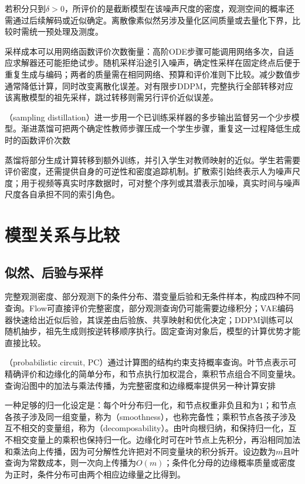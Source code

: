 若积分只到$\delta>0$，所评价的是截断模型在该噪声尺度的密度，观测空间的概率还需通过后续解码或近似确定。离散像素似然另涉及量化区间质量或去量化下界，比较时需统一预处理及测度。

采样成本可以用网络函数评价次数衡量：高阶ODE步骤可能调用网络多次，自适应求解器还可能拒绝试步。随机采样沿途引入噪声，确定性采样在固定终点后便于重复生成与编码；两者的质量需在相同网络、预算和评价准则下比较。减少数值步通常降低计算，同时改变离散化误差。对有限步DDPM，完整执行全部转移对应该离散模型的祖先采样，跳过转移则需另行评价近似误差。

（sampling distillation）进一步用一个已训练采样器的多步输出监督另一个少步模型。渐进蒸馏可把两个确定性教师步骤压成一个学生步骤，重复这一过程降低生成时的函数评价次数

蒸馏将部分生成计算转移到额外训练，并引入学生对教师映射的近似。学生若需要评价密度，还需提供自身的可逆性和密度追踪机制。扩散索引始终表示人为噪声尺度；用于视频等真实时序数据时，可对整个序列或其潜表示加噪，真实时间与噪声尺度各自承担不同的索引角色。

\section{模型关系与比较}
\label{sec:pgm-generative-comparison}

\subsection{似然、后验与采样}
\label{sec:pgm-generative-likelihood-posterior-sampling}

完整观测密度、部分观测下的条件分布、潜变量后验和无条件样本，构成四种不同查询。Flow可直接评价完整密度，部分观测查询仍可能需要边缘积分；VAE编码器快速给出近似后验，其误差由后验族、共享映射和优化决定；DDPM训练可以随机抽步，祖先生成则按逆转移顺序执行。固定查询对象后，模型的计算优势才能直接比较。

（probabilistic circuit, PC）通过计算图的结构约束支持概率查询。叶节点表示可精确评价和边缘化的简单分布，和节点执行加权混合，乘积节点组合不同变量块。查询沿图中的加法与乘法传播，为完整密度和边缘概率提供另一种计算安排

一种足够的归一化设定是：每个叶分布归一化，和节点权重非负且和为$1$；和节点各孩子涉及同一组变量，称为（smoothness），也称完备性；乘积节点各孩子涉及互不相交的变量组，称为（decomposability）。由叶向根归纳，和保持归一化，互不相交变量上的乘积也保持归一化。边缘化时可在叶节点上先积分，再沿相同加法和乘法向上传播，因为可分解性允许把对不同变量块的积分拆开。设边数为$m$且叶查询为常数成本，则一次向上传播为$O(m)$；条件化分母的边缘概率质量或密度为正时，条件分布可由两个相应边缘量之比得到。

